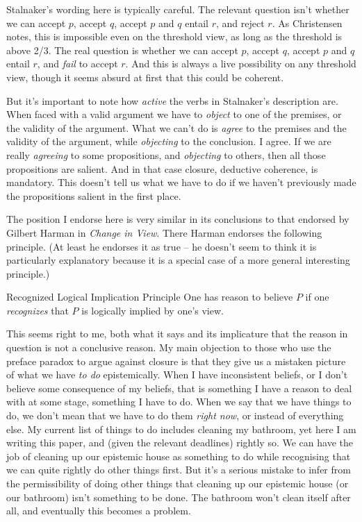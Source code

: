 \noindent Stalnaker's wording here is typically careful. The relevant question isn't whether we can accept \(p\), accept \(q\), accept \(p\) and \(q\) entail \(r\), and reject \(r\). As Christensen \citeyearpar[Ch. 4]{Christensen2005} notes, this is impossible even on the threshold view, as long as the threshold is above 2/3. The real question is whether we can accept \(p\), accept \(q\), accept \(p\) and \(q\) entail \(r\), and \textit{fail }to accept \(r\). And this is always a live possibility on any threshold view, though it seems absurd at first that this could be coherent.

But it's important to note how \textit{active} the verbs in Stalnaker's description are. When faced with a valid argument we have to \textit{object} to one of the premises, or the validity of the argument. What we can't do is \textit{agree} to the premises and the validity of the argument, while \textit{objecting} to the conclusion. I agree. If we are really \textit{agreeing} to some propositions, and \textit{objecting} to others, then all those propositions are salient. And in that case closure, deductive coherence, is mandatory. This doesn't tell us what we have to do if we haven't previously made the propositions salient in the first place.

The position I endorse here is very similar in its conclusions to that endorsed by Gilbert Harman in \textit{Change in View}. There Harman endorses the following principle. (At least he endorses it as true -- he doesn't seem to think it is particularly explanatory because it is a special case of a more general interesting principle.)

\begin{description*}
\item[Recognized Logical Implication Principle] One has reason to believe \(P\) if one \textit{recognizes} that \(P\) is logically implied by one's view. \cite[17]{Harman1986}
\end{description*}

\noindent This seems right to me, both what it says and its implicature that the reason in question is not a conclusive reason. My main objection to those who use the preface paradox to argue against closure is that they give us a mistaken picture of what we have \textit{to do} epistemically. When I have inconsistent beliefs, or I don't believe some consequence of my beliefs, that is something I have a reason to deal with at some stage, something I have to do. When we say that we have things to do, we don't mean that we have to do them \textit{right now}, or instead of everything else. My current list of things to do includes cleaning my bathroom, yet here I am writing this paper, and (given the relevant deadlines) rightly so. We can have the job of cleaning up our epistemic house as something to do while recognising that we can quite rightly do other things first. But it's a serious mistake to infer from the permissibility of doing other things that cleaning up our epistemic house (or our bathroom) isn't something to be done. The bathroom won't clean itself after all, and eventually this becomes a problem.

